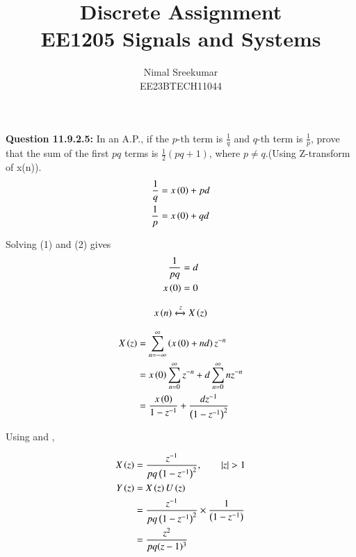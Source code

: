 \documentclass[a4,12pt,twocolumn]{IEEEtran}
\begin{document}
\let\vec\mathbf

\title{
\Huge\textbf{Discrete Assignment}\\
\Huge\textbf{EE1205} Signals and Systems\\
}
\large\author{Nimal Sreekumar\\EE23BTECH11044}

\maketitle



\bigskip

\renewcommand{\thefigure}{\theenumi}
\renewcommand{\thetable}{\theenumi}


\textbf{Question 11.9.2.5:}
In an A.P., if the \(p\)-th term is \(\frac{1}{q}\) and \(q\)-th term is \(\frac{1}{p}\), prove that the sum of the first \(pq\) terms is \(\frac{1}{2}(pq + 1)\), where \(p \neq q\).(Using Z-transform of x(n)).\\

\solution
\begin{align}
    \frac{1}{q} &= x\left(0\right) + pd \\
    \frac{1}{p} &= x\left(0\right) + qd
\end{align}

Solving (1) and (2) gives
\begin{align}
    \frac{1}{pq} &= d\\
    x\left(0\right) &= 0
\end{align}

\begin{align}
x\left(n\right) \xleftrightarrow z  X\left(z\right)
\end{align}

\begin{align}
X\left(z\right) &=\sum_{n=-\infty}^{\infty} \left(x\left(0\right) + nd\right) z^{-n}\\
&= x\left(0\right) \sum_{n=0}^{\infty} z^{-n} + d \sum_{n=0}^{\infty}nz^{-n}\\
&= \frac{x\left(0\right)}{1-z^{-1}} + \frac{dz^{-1}}{\left(1-z^{-1}\right)^2}  
\end{align}

Using  and ,

\begin{align}
X\left(z\right) &= \frac{z^{-1}}{pq\left(1-z^{-1}\right)^2} , \qquad |z| > 1\\
Y\left(z\right) &= X\left(z\right)U\left(z\right) \\
&= \frac{z^{-1}}{pq\left(1-z^{-1}\right)^2} \times \frac{1}{\left(1-z^{-1}\right)}\\
&= \frac{z^2}{pq(z-1)^3}
\end{align}
\end{document}
